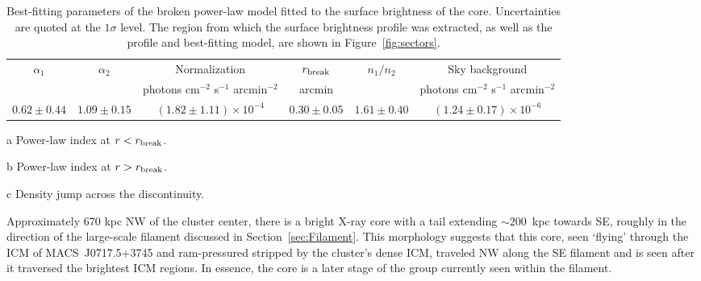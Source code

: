 \begin{table}
  \caption{Best-fitting parameters of the broken power-law model fitted to the surface brightness of the core. Uncertainties are quoted at the $1\sigma$ level. The region from which the surface brightness profile was extracted, as well as the profile and best-fitting model, are shown in Figure~\ref{fig:sectors}.\label{tab:bknpow}}
  \begin{center}
    \begin{threeparttable}
      \begin{tabular}{c c c c c c}
              $\alpha_1$\tnote{a} & $\alpha_2$\tnote{b} & Normalization & $r_{\rm break}$ & $n_1/n_2$\tnote{c} &  Sky background \\
                               &        &     photons cm$^{-2}$ s$^{-1}$ arcmin$^{-2}$       & arcmin   & &    photons cm$^{-2}$ s$^{-1}$ arcmin$^{-2}$ \\
              \hline
              $0.62 \pm 0.44$ & $1.09 \pm 0.15$ & $(1.82 \pm 1.11)  \times 10^{-4}$ & $0.30\pm 0.05$ & $1.61\pm 0.40$ & $(1.24 \pm 0.17) \times 10^{-6} $ \\
      \end{tabular}
      \begin{tablenotes}
              \item[a] Power-law index at $r < r_{\rm break}$.
              \item[b] Power-law index at $r > r_{\rm break}$.
              \item[c] Density jump across the discontinuity.
      \end{tablenotes}
    \end{threeparttable}
  \end{center}
\end{table}

Approximately 670 kpc NW of the cluster center, there is a bright X-ray core with a tail extending $\sim 200$~kpc towards SE, roughly in the direction of the large-scale filament discussed in Section~\ref{sec:Filament}. This morphology suggests that this core, seen `flying' through the ICM of MACS~J0717.5+3745 and ram-pressured stripped by the cluster's dense ICM, traveled NW along the SE filament and is seen after it traversed the brightest ICM regions. In essence, the core is a later stage of the group currently seen within the filament. 

